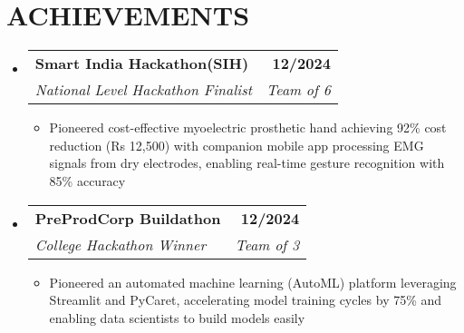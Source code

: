 \documentclass[letterpaper,11pt]{article}
\makeatletter
\def\spaceBelowEdSec{-8pt}
\def\spaceBelowTechSecContent{-8pt}
\def\spaceBetweenResumeItems{-4pt}
\def\spaceBetweenSubheadings{-1pt}
\def\spaceAfterSubheading{-7pt}
\newcommand{\resumeItem}[1]{
  \item\small{
    {#1 \vspace{\spaceBetweenResumeItems}}
  }
}
\newcommand{\resumeSubheading}[4]{
  \vspace{\spaceBetweenSubheadings}\item
    \begin{tabular*}{1.0\textwidth}[t]{l@{\extracolsep{\fill}}r}
      \textbf{\normalsize#1} & \textbf{\small #2} \\
      \textit{\normalsize#3} & \textit{\small #4} \\
    \end{tabular*}\vspace{\spaceAfterSubheading}
}
\newcommand{\resumeSubHeadingListStart}{\begin{itemize}[leftmargin=0.0in, label={}]}
\newcommand{\resumeSubHeadingListEnd}{\end{itemize}\vspace{\spaceBelowEdSec}}
\newcommand{\resumeItemListStart}{\begin{itemize}[leftmargin=0.1in]}
\newcommand{\resumeItemListEnd}{\end{itemize}\vspace{\spaceBelowTechSecContent}}
\makeatother
\begin{document}
\section{{ACHIEVEMENTS}}
\resumeSubHeadingListStart
    \resumeSubheading
      {Smart India Hackathon(SIH)}{12/2024}
      {National Level Hackathon Finalist}{Team of 6}
      \resumeItemListStart
        \resumeItem{Pioneered cost-effective myoelectric prosthetic hand achieving 92\% cost reduction (Rs 12,500) with companion mobile app processing EMG signals from dry electrodes, enabling real-time gesture recognition with 85\% accuracy}
      \resumeItemListEnd
\vspace{8pt}
      \resumeSubheading
      {PreProdCorp Buildathon}{12/2024}
      {College Hackathon Winner}{Team of 3}
      \resumeItemListStart
        \resumeItem{Pioneered an automated machine learning (AutoML) platform leveraging Streamlit and PyCaret, accelerating model training cycles by 75\% and enabling data scientists to build models easily}
      \resumeItemListEnd
\resumeSubHeadingListEnd
\end{document}
